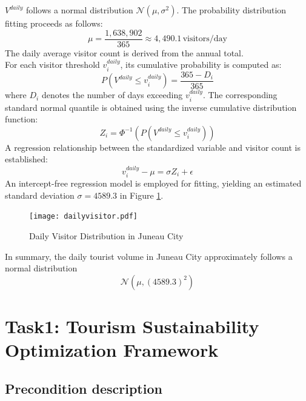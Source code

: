 \documentclass{mcmthesis}
\begin{document}
\begin{itemize}
  $V^{daily}$ follows a normal distribution $\mathcal{N}(\mu, \sigma^2)$. The probability distribution fitting proceeds as follows:
  $$\mu = \frac{1{,}638{,}902}{365} \approx 4{,}490.1 \, \text{visitors/day}$$
  The daily average visitor count is derived from the annual total.\\
  For each visitor threshold $v^{daily}_i$, its cumulative probability is computed as:
  $$P(V^{daily} \leq v^{daily}_i) = \frac{365 - D_i}{365}$$
  where $D_i$ denotes the number of days exceeding $v^{daily}_i$. The corresponding standard normal quantile is obtained using the inverse cumulative distribution function:
  $$Z_i = \Phi^{-1} \left( P(V^{daily} \leq v^{daily}_i) \right)$$
  A regression relationship between the standardized variable and visitor count is established:
  $$v^{daily}_i - \mu = \sigma Z_i + \epsilon$$
  An intercept-free regression model is employed for fitting, yielding an estimated standard deviation $\sigma = 4589.3$ in Figure \ref{fig:dailyvisitor}.\par
  \begin{figure}
    \centering
    \texttt{[image: dailyvisitor.pdf]}
    \caption{Daily Visitor Distribution in Juneau City} \label{fig:dailyvisitor}
  \end{figure}
  In summary, the daily tourist volume in Juneau City approximately follows a normal distribution 
  \begin{equation}
    \label{eq:dailyvisitor}
    \mathcal{N}(\mu, (4589.3)^2)
  \end{equation}
  
  
\end{itemize}

\section{Task1: Tourism Sustainability Optimization Framework}
\subsection{Precondition description}
\end{document}
